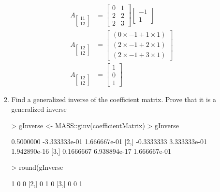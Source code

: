 \documentclass[12pt,a4paper]{paper}
\begin{document}
\begin{enumerate}
\begin{enumerate}
\begin{equation}
\begin{split}
A_{\left[\begin{array}{c}11\\12\end{array}\right]}&= \left[\begin{array}{cc}0&1\\2&2\\2&3\end{array}\right]\left[\begin{array}{c}-1\\1\end{array}\right]\\
A_{\left[\begin{array}{c}12\\12\end{array}\right]}&= \left[\begin{array}{c}(0 \times -1 + 1 \times 1)\\(2 \times -1 + 2 \times 1)\\(2 \times -1 + 3 \times 1)\end{array}\right]\\
A_{\left[\begin{array}{c}12\\12\end{array}\right]}&= \left[\begin{array}{c}1\\0\\1\end{array}\right]
\end{split}
\end{equation}
\item Find a generalized inverse of the coefficient matrix. Prove that it is a generalized inverse
\begin{Schunk}
\begin{Sinput}
> gInverse <- MASS::ginv(coefficientMatrix)
> gInverse
\end{Sinput}
\begin{Soutput}
           [,1]          [,2]         [,3]
[1,]  0.5000000 -3.333333e-01 1.666667e-01
[2,] -0.3333333  3.333333e-01 1.942890e-16
[3,]  0.1666667  6.938894e-17 1.666667e-01
\end{Soutput}
\begin{Sinput}
> round(gInverse %*% coefficientMatrix)
\end{Sinput}
\begin{Soutput}
     [,1] [,2] [,3]
[1,]    1    0    0
[2,]    0    1    0
[3,]    0    0    1
\end{Soutput}
\begin{Sinput}

\end{Sinput}
\end{Schunk}
\end{enumerate}
\end{enumerate}
\end{document}
